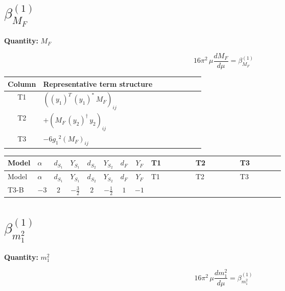 \documentclass[8pt]{article}
\begin{document}
\begin{landscape}
\section*{$\beta_{M_F}^{(1)}$}
\noindent\textbf{Quantity: }$M_F$\par\smallskip
\[16\pi^2\,\mu\frac{d M_F}{d\mu}=\beta_{M_F}^{(1)}\]
\begin{center}
\begin{tabular}{@{}c >{\raggedright\arraybackslash}p{0.82\linewidth}@{}}
\toprule
Column & Representative term structure \\
\midrule
T1 & \(\displaystyle \left(\left({y_1}\right)^{T}\,\left({y_1}\right)^{*}\,{M_F}\right)_{ij}\) \\
\midrule
T2 & \(\displaystyle +\left({M_F}\,\left({y_2}\right)^{\dagger}\,{y_2}\right)_{ij}\) \\
\midrule
T3 & \(\displaystyle -6 {g_1}^2 \left({M_F}\right)_{ij}\) \\
\midrule
\bottomrule
\end{tabular}
\end{center}
\smallskip
\tiny
\begin{longtable}{@{}llcccccc >{\raggedright\arraybackslash}p{0.21\linewidth} >{\raggedright\arraybackslash}p{0.21\linewidth} >{\raggedright\arraybackslash}p{0.21\linewidth}@{}}
\toprule
Model & $\alpha$ & $d_{S_1}$ & $Y_{S_1}$ & $d_{S_2}$ & $Y_{S_2}$ & $d_F$ & $Y_F$ & T1 & T2 & T3 \\
\midrule
\endfirsthead
\toprule
Model & $\alpha$ & $d_{S_1}$ & $Y_{S_1}$ & $d_{S_2}$ & $Y_{S_2}$ & $d_F$ & $Y_F$ & T1 & T2 & T3 \\
\midrule
\endhead
T3-B & $-3$ & $2$ & $-\frac{3}{2}$ & $2$ & $-\frac{1}{2}$ & $1$ & $-1$ & \scriptsize\adjustbox{max width=\linewidth}{$\begin{gathered} \left(\left({y_1}\right)^{T}\,\left({y_1}\right)^{*}\,{M_F}\right)_{ij}\end{gathered}$} & \scriptsize\adjustbox{max width=\linewidth}{$\begin{gathered} +\left({M_F}\,\left({y_2}\right)^{\dagger}\,{y_2}\right)_{ij}\end{gathered}$} & \scriptsize\adjustbox{max width=\linewidth}{$\begin{gathered} -6 {g_1}^2 \left({M_F}\right)_{ij}\end{gathered}$} \\
\midrule
\bottomrule
\end{longtable}
\clearpage
\section*{$\beta_{m_1^2}^{(1)}$}
\noindent\textbf{Quantity: }$m_1^2$\par\smallskip
\[16\pi^2\,\mu\frac{d m_1^2}{d\mu}=\beta_{m_1^2}^{(1)}\]

\end{landscape}
\end{document}
